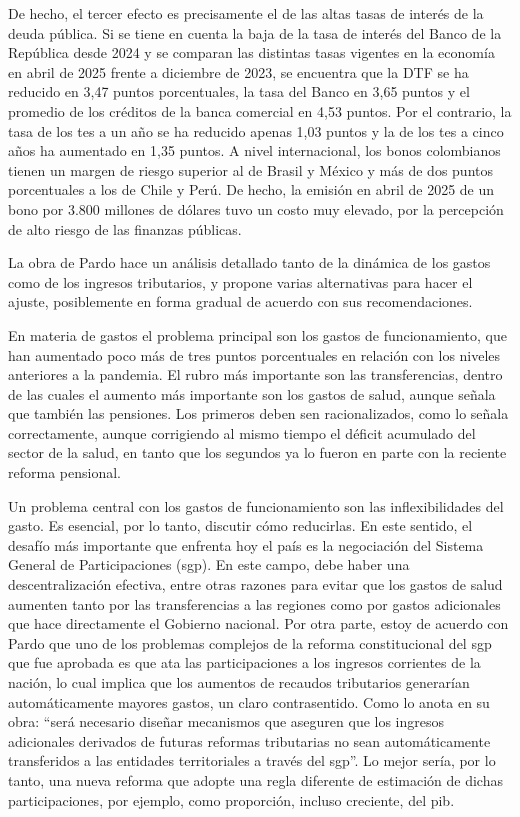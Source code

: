 \begin{prologo}
De hecho, el tercer efecto es precisamente el de las altas tasas de interés de la deuda pública. Si se tiene en cuenta la baja de la tasa de interés del Banco de la República desde 2024 y se comparan las distintas tasas vigentes en la economía en abril de 2025 frente a diciembre de 2023, se encuentra que la DTF se ha reducido en 3,47 puntos porcentuales, la tasa del Banco en 3,65 puntos y el promedio de los créditos de la banca comercial en 4,53 puntos. Por el contrario, la tasa de los \gls{tes} a un año se ha reducido apenas 1,03 puntos y la de los \gls{tes} a cinco años ha aumentado en 1,35 puntos. A nivel internacional, los bonos colombianos tienen un margen de riesgo superior al de Brasil y México y más de dos puntos porcentuales a los de Chile y Perú. De hecho, la emisión en abril de 2025 de un bono por 3.800 millones de dólares tuvo un costo muy elevado, por la percepción de alto riesgo de las finanzas públicas.

La obra de Pardo hace un análisis detallado tanto de la dinámica de los gastos como de los ingresos tributarios, y propone varias alternativas para hacer el ajuste, posiblemente en forma gradual de acuerdo con sus recomendaciones. 

En materia de gastos el problema principal son los gastos de funcionamiento, que han aumentado poco más de tres puntos porcentuales en relación con los niveles anteriores a la pandemia. El rubro más importante son las transferencias, dentro de las cuales el aumento más importante son los gastos de salud, aunque señala que también las pensiones. Los primeros deben sen racionalizados, como lo señala correctamente, aunque corrigiendo al mismo tiempo el déficit acumulado del sector de la salud, en tanto que los segundos ya lo fueron en parte con la reciente reforma pensional.

Un problema central con los gastos de funcionamiento son las inflexibilidades del gasto. Es esencial, por lo tanto, discutir cómo reducirlas. En este sentido, el desafío más importante que enfrenta hoy el país es la negociación del Sistema General de Participaciones (\gls{sgp}). En este campo, debe haber una descentralización efectiva, entre otras razones para evitar que los gastos de salud aumenten tanto por las transferencias a las regiones como por gastos adicionales que hace directamente el Gobierno nacional. Por otra parte, estoy de acuerdo con Pardo que uno de los problemas complejos de la reforma constitucional del \gls{sgp} que fue aprobada es que ata las participaciones a los ingresos corrientes de la nación, lo cual implica que los aumentos de recaudos tributarios generarían automáticamente mayores gastos, un claro contrasentido. Como lo anota en su obra: “será necesario diseñar mecanismos que aseguren que los ingresos adicionales derivados de futuras reformas tributarias no sean automáticamente transferidos a las entidades territoriales a través del \gls{sgp}”. Lo mejor sería, por lo tanto, una nueva reforma que adopte una regla diferente de estimación de dichas participaciones, por ejemplo, como proporción, incluso creciente, del \gls{pib}.


\end{prologo}
